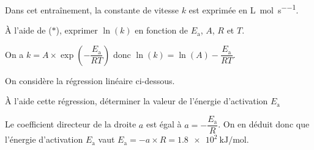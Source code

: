 \debutEntrainement

\smallskip

Dans cet entraînement, la constante de vitesse $k$ est exprimée en \si{\liter\per\mol\per\second}.



\begin{enonce}
À l'aide de ($\ast$), exprimer $\ln(k)$ en fonction de $E_\text{a}$, $A$, $R$ et $T$.
\end{enonce}


\begin{corrige}
On a
$k = A \times \exp\left(-\dfrac{E_\text{a}}{RT}\right)$ donc $\ln (k) = \ln (A) -\dfrac{E_\text{a}}{RT}$.
\end{corrige}



\pauseEntrainement

On considère la régression linéaire ci-dessous.

\begin{center}

\end{center}

\repriseEntrainement

\hauteurLargeurCadreReponse		{8mm}{3cm}



\begin{enonce}
À l'aide cette régression, déterminer la valeur de l'énergie d'activation $E_\text{a}$
\end{enonce}


\begin{corrige}
Le coefficient directeur de la droite $a$ est égal à $a = - \dfrac{E_\text{a}}{R}$. On en déduit donc que l'énergie d'activation $E_\text{a}$ vaut $E_\text{a} = - a \times R = \SI{1.8e2}{\kilo\joule\per\mol}$.
\end{corrige}

